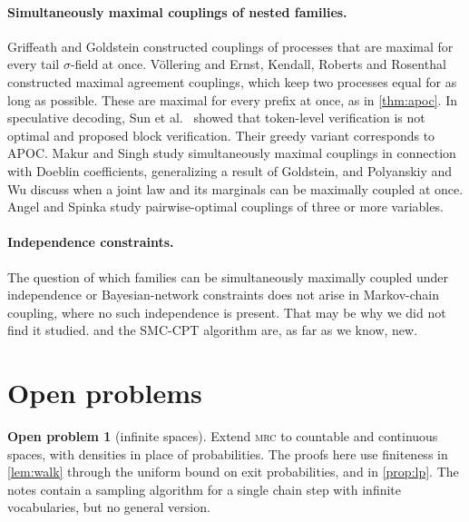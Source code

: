 \documentclass[11pt]{article}
\theoremstyle{definition}
\newtheorem{openproblem}[theorem]{Open problem}
\newcommand{\MRC}{\textnormal{\textsc{mrc}}}
\begin{document}
\paragraph{Simultaneously maximal couplings of nested families.}
Griffeath \cite{griffeath1975maximal} and Goldstein \cite{goldstein1979maximal}
constructed couplings of processes that are maximal for every tail
$\sigma$-field at once. Völlering \cite{vollering2016maximal} and Ernst, Kendall,
Roberts and Rosenthal \cite{ernst2019mexit} constructed maximal agreement
couplings, which keep two processes equal for as long as possible. These are
maximal for every prefix at once, as in \cref{thm:apoc}. In speculative
decoding, Sun et al.~\cite{sun2024block} showed that token-level verification
is not optimal and proposed block verification. Their greedy variant
corresponds to APOC. Makur and Singh \cite{makur2024doeblin} study
simultaneously maximal couplings in connection with Doeblin coefficients,
generalizing a result of Goldstein, and Polyanskiy and Wu
\cite{polyanskiy2017strong} discuss when a joint law and its marginals can be
maximally coupled at once. Angel and Spinka \cite{angel2021pairwise} study
pairwise-optimal couplings of three or more variables.

\paragraph{Independence constraints.}
The question of which families can be simultaneously maximally coupled under
independence or Bayesian-network constraints does not arise in Markov-chain
coupling, where no such independence is present. That may be why we did not
find it studied.  and the SMC-CPT algorithm
are, as far as we know, new.

\section{Open problems}\label{sec:open}

\begin{openproblem}[infinite spaces]
Extend \MRC{} to countable and continuous spaces, with densities in place of
probabilities. The proofs here use finiteness in \cref{lem:walk} through the
uniform bound on exit probabilities, and in \cref{prop:lp}. The notes contain a
sampling algorithm for a single chain step with infinite vocabularies, but no
general version.
\end{openproblem}
\end{document}
